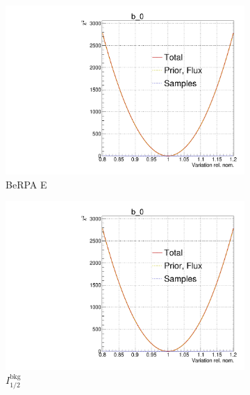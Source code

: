 \begin{figure}[h]
	\begin{subfigure}[t]{0.32\textwidth}
		\includegraphics[width=\textwidth,page=116, trim={0mm 0mm 0mm 9mm}, clip]{figures/mach3/2018/llh/tryBinningNumber6_after_fit_asimov_asimov_ND280logL_scan}
		\caption{BeRPA E}
	\end{subfigure}
	\begin{subfigure}[t]{0.32\textwidth}
		\includegraphics[width=\textwidth,page=120, trim={0mm 0mm 0mm 9mm}, clip]{figures/mach3/2018/llh/tryBinningNumber6_after_fit_asimov_asimov_ND280logL_scan}
		\caption{$I_{1/2}^\text{bkg}$}
	\end{subfigure}
	\begin{subfigure}[t]{0.32\textwidth}

\end{subfigure}
\end{figure}
